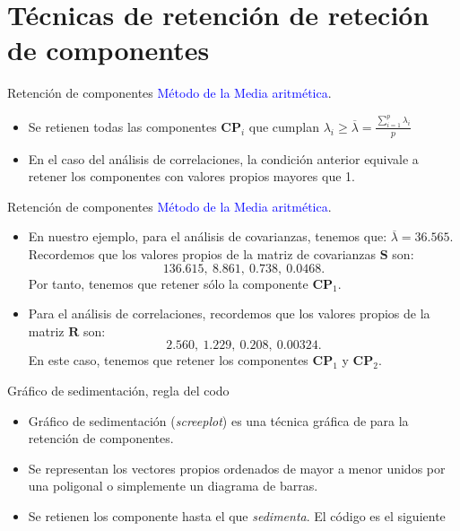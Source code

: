 \documentclass[
  ignorenonframetext,
]{beamer}
\newcommand\blue[1]{\textcolor{blue}{#1}}
\begin{document}
\section{Técnicas de retención de reteción de
componentes}\label{tuxe9cnicas-de-retenciuxf3n-de-reteciuxf3n-de-componentes}

\begin{frame}{Retención de componentes}
\label{retenciuxf3n-de-componentes-2}
\blue{Método de la Media aritmética}.

\begin{itemize}
\item
  Se retienen todas las componentes \(\mathbf{CP}_i\) que cumplan
  \(\lambda_i\geq\overline{\lambda}=\frac{\sum_{i=1}^p \lambda_i}{p}\)
\item
  En el caso del análisis de correlaciones, la condición anterior
  equivale a retener los componentes con valores propios mayores que 1.
\end{itemize}
\end{frame}

\begin{frame}{Retención de componentes}
\label{retenciuxf3n-de-componentes-3}
\blue{Método de la Media aritmética}.

\begin{itemize}
\item
  En nuestro ejemplo, para el análisis de covarianzas, tenemos que:
  \(\overline{\lambda}=36.565\). Recordemos que los valores propios de
  la matriz de covarianzas \(\mathbf{S}\) son:
  \[136.615,\ 8.861,\ 0.738,\ 0.0468.\] Por tanto, tenemos que retener
  sólo la componente \(\mathbf{CP}_1\).
\item
  Para el análisis de correlaciones, recordemos que los valores propios
  de la matriz \(\mathbf{R}\) son: \[2.560,\ 1.229,\ 0.208,\ 0.00324.\]
  En este caso, tenemos que retener los componentes \(\mathbf{CP}_1\) y
  \(\mathbf{CP}_2\).
\end{itemize}
\end{frame}

\begin{frame}{Gráfico de sedimentación, regla del codo}
\label{gruxe1fico-de-sedimentaciuxf3n-regla-del-codo}
\begin{itemize}
\item
  Gráfico de sedimentación (\emph{screeplot}) es una técnica gráfica de
  para la retención de componentes.
\item
  Se representan los vectores propios ordenados de mayor a menor unidos
  por una poligonal o simplemente un diagrama de barras.
\item
  Se retienen los componente hasta el que \emph{sedimenta}. El código es
  el siguiente
\end{itemize}
\end{frame}
\end{document}
